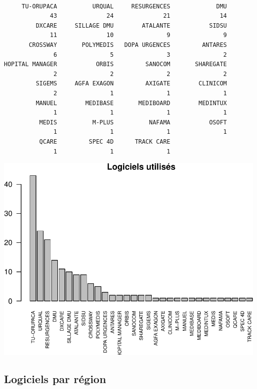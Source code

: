 \documentclass[]{article}
\begin{document}
\begin{verbatim}

     TU-ORUPACA          URQUAL     RESURGENCES             DMU 
             43              24              21              14 
         DXCARE     SILLAGE DMU        ATALANTE           SIDSU 
             11              10               9               9 
       CROSSWAY       POLYMEDIS   DOPA URGENCES         ANTARES 
              6               5               3               2 
HOPITAL MANAGER           ORBIS         SANOCOM       SHAREGATE 
              2               2               2               2 
         SIGEMS     AGFA EXAGON         AXIGATE        CLINICOM 
              2               1               1               1 
         MANUEL        MEDIBASE       MEDIBOARD        MEDINTUX 
              1               1               1               1 
          MEDIS          M-PLUS          NAFAMA           OSOFT 
              1               1               1               1 
          QCARE         SPEC 4D      TRACK CARE 
              1               1               1 
\end{verbatim}

\includegraphics{septembre2015_files/figure-latex/unnamed-chunk-3-1.pdf}

\subsection{Logiciels par région}\label{logiciels-par-region}
\end{document}
